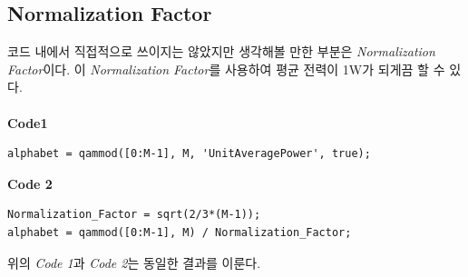 \documentclass{article}
\newcommand{\bd}{\textbf} %
\begin{document}
\subsection{Normalization Factor}
코드 내에서 직접적으로 쓰이지는 않았지만 생각해볼 만한 부분은 \textsl{Normalization Factor}이다. 이 \textsl{Normalization Factor}를 사용하여 평균 전력이 1W가 되게끔 할 수 있다.\\
\\
\bd{Code1}
\begin{lstlisting}[style=Matlab-editor, frame=single]
alphabet = qammod([0:M-1], M, 'UnitAveragePower', true);
\end{lstlisting}
\vspace{0.1cm}
\bd{Code 2}
\begin{lstlisting}[style=Matlab-editor, frame=single]
Normalization_Factor = sqrt(2/3*(M-1));
alphabet = qammod([0:M-1], M) / Normalization_Factor;
\end{lstlisting}
위의 \textsl{Code 1}과 \textsl{Code 2}는 동일한 결과를 이룬다.\\
\end{document}
